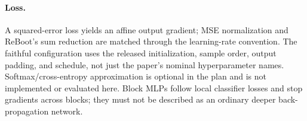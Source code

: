 \paragraph{Loss.}
A squared-error loss yields an affine output gradient; MSE normalization and ReBoot's sum reduction are matched through the learning-rate convention. The faithful configuration uses the released initialization, sample order, output padding, and schedule, not just the paper's nominal hyperparameter names. Softmax/cross-entropy approximation is optional in the plan and is not implemented or evaluated here. Block MLPs follow local classifier losses and stop gradients across blocks; they must not be described as an ordinary deeper back-propagation network.
